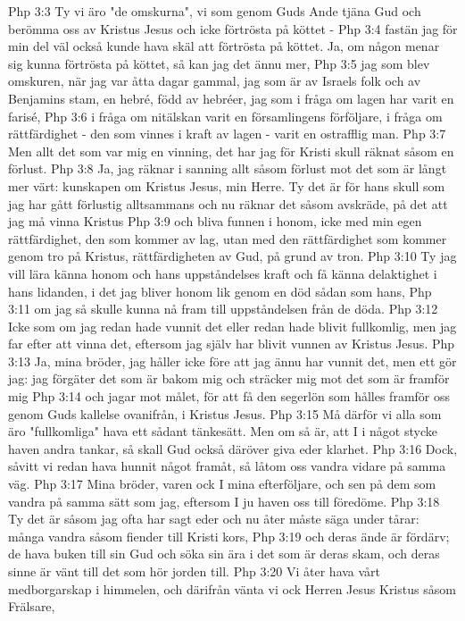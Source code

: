 Php 3:3  Ty vi äro "de omskurna", vi som genom Guds Ande tjäna Gud och berömma oss av Kristus Jesus och icke förtrösta på köttet -
Php 3:4  fastän jag för min del väl också kunde hava skäl att förtrösta på köttet. Ja, om någon menar sig kunna förtrösta på köttet, så kan jag det ännu mer,
Php 3:5  jag som blev omskuren, när jag var åtta dagar gammal, jag som är av Israels folk och av Benjamins stam, en hebré, född av hebréer, jag som i fråga om lagen har varit en farisé,
Php 3:6  i fråga om nitälskan varit en församlingens förföljare, i fråga om rättfärdighet - den som vinnes i kraft av lagen - varit en ostrafflig man.
Php 3:7  Men allt det som var mig en vinning, det har jag för Kristi skull räknat såsom en förlust.
Php 3:8  Ja, jag räknar i sanning allt såsom förlust mot det som är långt mer värt: kunskapen om Kristus Jesus, min Herre. Ty det är för hans skull som jag har gått förlustig alltsammans och nu räknar det såsom avskräde, på det att jag må vinna Kristus
Php 3:9  och bliva funnen i honom, icke med min egen rättfärdighet, den som kommer av lag, utan med den rättfärdighet som kommer genom tro på Kristus, rättfärdigheten av Gud, på grund av tron.
Php 3:10  Ty jag vill lära känna honom och hans uppståndelses kraft och få känna delaktighet i hans lidanden, i det jag bliver honom lik genom en död sådan som hans,
Php 3:11  om jag så skulle kunna nå fram till uppståndelsen från de döda.
Php 3:12  Icke som om jag redan hade vunnit det eller redan hade blivit fullkomlig, men jag far efter att vinna det, eftersom jag själv har blivit vunnen av Kristus Jesus.
Php 3:13  Ja, mina bröder, jag håller icke före att jag ännu har vunnit det, men ett gör jag: jag förgäter det som är bakom mig och sträcker mig mot det som är framför mig
Php 3:14  och jagar mot målet, för att få den segerlön som hålles framför oss genom Guds kallelse ovanifrån, i Kristus Jesus.
Php 3:15  Må därför vi alla som äro "fullkomliga" hava ett sådant tänkesätt. Men om så är, att I i något stycke haven andra tankar, så skall Gud också däröver giva eder klarhet.
Php 3:16  Dock, såvitt vi redan hava hunnit något framåt, så låtom oss vandra vidare på samma väg.
Php 3:17  Mina bröder, varen ock I mina efterföljare, och sen på dem som vandra på samma sätt som jag, eftersom I ju haven oss till föredöme.
Php 3:18  Ty det är såsom jag ofta har sagt eder och nu åter måste säga under tårar: många vandra såsom fiender till Kristi kors,
Php 3:19  och deras ände är fördärv; de hava buken till sin Gud och söka sin ära i det som är deras skam, och deras sinne är vänt till det som hör jorden till.
Php 3:20  Vi åter hava vårt medborgarskap i himmelen, och därifrån vänta vi ock Herren Jesus Kristus såsom Frälsare,
